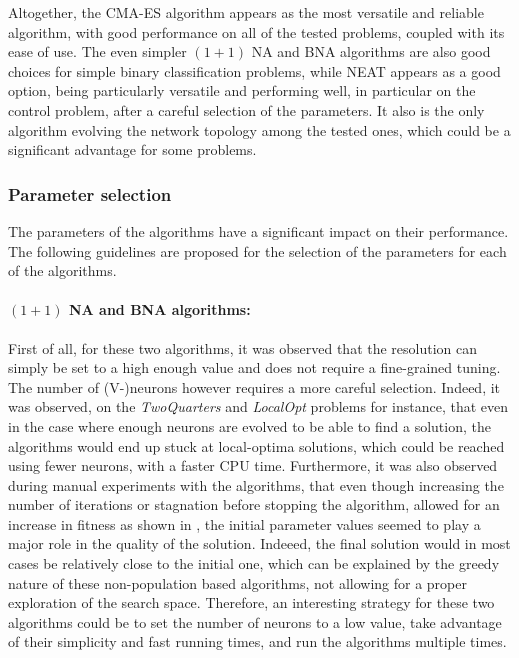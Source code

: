 Altogether, the CMA-ES algorithm appears as the most versatile and reliable algorithm, with good performance on all of the tested problems, coupled with its ease of use. The even simpler $(1 + 1)$ NA
and BNA algorithms are also good choices for simple binary classification problems, while NEAT appears as a good option, being particularly versatile and performing well, in particular
on the control problem, after a careful selection of the parameters. It also is the only algorithm evolving the network topology among the tested ones, which could be a significant advantage
for some problems.

\subsubsection{Parameter selection}

The parameters of the algorithms have a significant impact on their performance. The following guidelines are proposed for the selection of the parameters for each of the algorithms.

\paragraph{$(1 + 1)$ NA and BNA algorithms:} First of all, for these two algorithms, it was observed that the resolution can simply be set to a high enough value and does not require a
fine-grained tuning. The number of (V-)neurons however requires a more careful selection. Indeed, it was observed, on the \textit{TwoQuarters} and \textit{LocalOpt} problems for instance, that
even in the case where enough neurons are evolved to be able to find a solution, the algorithms would end up stuck at local-optima solutions, which could be reached using fewer neurons, with a
faster CPU time. Furthermore, it was also observed during manual experiments with the algorithms, that even though increasing the number of iterations or stagnation before stopping the algorithm,
allowed for an increase in fitness as shown in , the initial parameter values seemed to play a major role in the quality of the solution. Indeeed, the final solution would in
most cases be relatively close to the initial one, which can be explained by the greedy nature of these non-population based algorithms, not allowing for a proper exploration of the search space.
Therefore, an interesting strategy for these two algorithms could be to set the number of neurons to a low value, take advantage of their simplicity and fast running times, and run the algorithms
multiple times.

